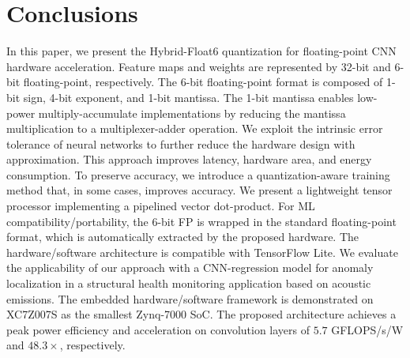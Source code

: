 \section{Conclusions}
\label{sec:conclusions}
In this paper, we present the Hybrid-Float6 quantization for floating-point CNN hardware acceleration. Feature maps and weights are represented by 32-bit and 6-bit floating-point, respectively. The 6-bit floating-point format is composed of 1-bit sign, 4-bit exponent, and 1-bit mantissa. The 1-bit mantissa enables low-power multiply-accumulate implementations by reducing the mantissa multiplication to a multiplexer-adder operation. We exploit the intrinsic error tolerance of neural networks to further reduce the hardware design with approximation. This approach improves latency, hardware area, and energy consumption. To preserve accuracy, we introduce a quantization-aware training method that, in some cases, improves accuracy. We present a lightweight tensor processor implementing a pipelined vector dot-product. For ML compatibility/portability, the 6-bit FP is wrapped in the standard floating-point format, which is automatically extracted by the proposed hardware. The hardware/software architecture is compatible with TensorFlow Lite. We evaluate the applicability of our approach with a CNN-regression model for anomaly localization in a structural health monitoring application based on acoustic emissions. The embedded hardware/software framework is demonstrated on XC7Z007S as the smallest Zynq-7000 SoC. The proposed architecture achieves a peak power efficiency and acceleration on convolution layers of $5.7$ GFLOPS/s/W and $48.3\times$, respectively.
